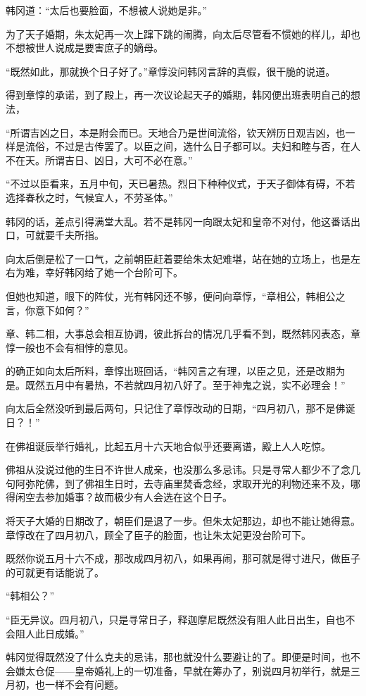 韩冈道：“太后也要脸面，不想被人说她是非。”

为了天子婚期，朱太妃再一次上蹿下跳的闹腾，向太后尽管看不惯她的样儿，却也不想被世人说成是要害庶子的嫡母。

“既然如此，那就换个日子好了。”章惇没问韩冈言辞的真假，很干脆的说道。

得到章惇的承诺，到了殿上，再一次议论起天子的婚期，韩冈便出班表明自己的想法，

“所谓吉凶之日，本是附会而已。天地合乃是世间流俗，钦天辨历日观吉凶，也一样是流俗，不过是古传罢了。以臣之间，选什么日子都可以。夫妇和睦与否，在人不在天。所谓吉日、凶日，大可不必在意。”

“不过以臣看来，五月中旬，天已暑热。烈日下种种仪式，于天子御体有碍，不若选择春秋之时，气候宜人，不劳圣体。”

韩冈的话，差点引得满堂大乱。若不是韩冈一向跟太妃和皇帝不对付，他这番话出口，可就要千夫所指。

向太后倒是松了一口气，之前朝臣赶着要给朱太妃难堪，站在她的立场上，也是左右为难，幸好韩冈给了她一个台阶可下。

但她也知道，眼下的阵仗，光有韩冈还不够，便问向章惇，“章相公，韩相公之言，你意下如何？”

章、韩二相，大事总会相互协调，彼此拆台的情况几乎看不到，既然韩冈表态，章惇一般也不会有相悖的意见。

的确正如向太后所料，章惇出班回话，“韩冈言之有理，以臣之见，还是改期为是。既然五月中有暑热，不若就四月初八好了。至于神鬼之说，实不必理会！”

向太后全然没听到最后两句，只记住了章惇改动的日期，“四月初八，那不是佛诞日？！”

在佛祖诞辰举行婚礼，比起五月十六天地合似乎还要离谱，殿上人人吃惊。

佛祖从没说过他的生日不许世人成亲，也没那么多忌讳。只是寻常人都少不了念几句阿弥陀佛，到了佛祖生日时，去寺庙里焚香念经，求取开光的利物还来不及，哪得闲空去参加婚事？故而极少有人会选在这个日子。

将天子大婚的日期改了，朝臣们是退了一步。但朱太妃那边，却也不能让她得意。章惇改在了四月初八，顾全了臣子的脸面，也让朱太妃更没台阶可下。

既然你说五月十六不成，那改成四月初八，如果再闹，那可就是得寸进尺，做臣子的可就更有话能说了。

“韩相公？”

“臣无异议。四月初八，只是寻常日子，释迦摩尼既然没有阻人此日出生，自也不会阻人此日成婚。”

韩冈觉得既然没了什么克夫的忌讳，那也就没什么要避让的了。即便是时间，也不会嫌太仓促——皇帝婚礼上的一切准备，早就在筹办了，别说四月初举行，就是三月初，也一样不会有问题。

